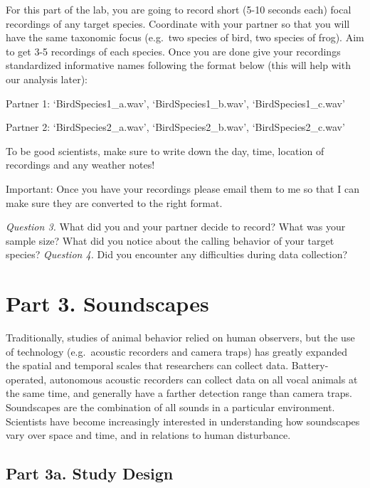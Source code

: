 \documentclass[]{book}
\begin{document}
For this part of the lab, you are going to record short (5-10 seconds each) focal recordings of any target species. Coordinate with your partner so that you will have the same taxonomic focus (e.g.~two species of bird, two species of frog). Aim to get 3-5 recordings of each species. Once you are done give your recordings standardized informative names following the format below (this will help with our analysis later):

Partner 1: `BirdSpecies1\_a.wav', `BirdSpecies1\_b.wav', `BirdSpecies1\_c.wav'

Partner 2: `BirdSpecies2\_a.wav', `BirdSpecies2\_b.wav', `BirdSpecies2\_c.wav'

To be good scientists, make sure to write down the day, time, location of recordings and any weather notes!

Important: Once you have your recordings please email them to me so that I can make sure they are converted to the right format.

\emph{Question 3.} What did you and your partner decide to record? What was your sample size? What did you notice about the calling behavior of your target species?
\emph{Question 4.} Did you encounter any difficulties during data collection?

\hypertarget{part-3.-soundscapes-1}{%
\section*{Part 3. Soundscapes}\label{part-3.-soundscapes-1}}

Traditionally, studies of animal behavior relied on human observers, but the use of technology (e.g.~acoustic recorders and camera traps) has greatly expanded the spatial and temporal scales that researchers can collect data. Battery-operated, autonomous acoustic recorders can collect data on all vocal animals at the same time, and generally have a farther detection range than camera traps. Soundscapes are the combination of all sounds in a particular environment. Scientists have become increasingly interested in understanding how soundscapes vary over space and time, and in relations to human disturbance.

\hypertarget{part-3a.-study-design}{%
\subsection*{Part 3a. Study Design}\label{part-3a.-study-design}}
\end{document}
